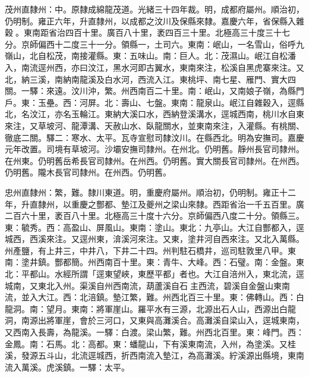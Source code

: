 \begin{pinyinscope}
茂州直隸州：中。原隸成綿龍茂道。光緒三十四年裁。明，成都府屬州。順治初，仍明制。雍正六年，升直隸州，以成都之汶川及保縣來隸。嘉慶六年，省保縣入雜穀。東南距省治四百十里。廣百八十里，袤四百三十里。北極高三十度三十七分。京師偏西十二度三十一分。領縣一，土司六。東南：岷山，一名雪山，俗呼九嶺山，北自松茂，南接灌縣。東：五味山。南：巨人。北：茂濕山。岷江自松潘入，南流逕州西，亦曰汶江，黑水河即古翼水，東南來注，松溪自黑虎寨來注。又北，納三溪，南納南龍溪及白水河，西流入江。東桃坪、南七星、雁門、實大四關。一驛：來遠。汶川沖，繁。州西南百二十里。南：岷山，又南娘子嶺，為縣門戶。東：玉壘。西：河屏。北：壽山、七盤。東南：龍泉山。岷江自雜穀入，逕縣北，名汶江，亦名玉輪江。東納大溪口水，西納登溪溝水，逕城西南，桃川水自東來注，又草坡河、龍潭溝、天赦山水、臥龍關水，並東南來注，入灌縣。有桃關、徹底二關。驛二：寒水、太平。瓦寺宣慰司隸汶川。在縣西北。明為安撫司。嘉慶元年改置。司境有草坡河。沙壩安撫司隸州。在州北。仍明舊。靜州長官司隸州。在州東。仍明舊岳希長官司隸州。在州西。仍明舊。實大關長官司隸州。在州西。仍明舊。隴木長官司隸州。在州西。仍明舊。

忠州直隸州：繁，難。隸川東道。明，重慶府屬州。順治初，仍明制。雍正十二年，升直隸州，以重慶之酆都、墊江及夔州之梁山來隸。西距省治一千五百里。廣二百六十里，袤百八十里。北極高三十度十六分。京師偏西八度二十分。領縣三。東：毓秀。西：高盈山、屏風山。東南：塗山。東北：九亭山。大江自酆都入，逕城西，西溪來注。又逕州東，渰溪河來注。又東，塗井河自西來注。又北入萬縣。州產鹽，有上井三，中井八，下井二十四。州判駐石橋井，巡司駐敦里八甲。東南：塗井鎮。酆都簡。州西南百十里。東：青牛、大峰。西：石璧。南：金盤。東北：平都山。水經所謂「逕東望峽，東歷平都」者也。大江自涪州入，東北流，逕城南，又東北入州。渠溪自州西南流，葫蘆溪自石主西流，碧溪自金盤山東南流，並入大江。西：北涪鎮。墊江繁，難。州西北百三十里。東：佛轉山。西：白龍洞。南：望月。東南：將軍崖山。羅平水有三源，北源出石人山，西源出白龍洞，南源出將軍崖，會於三河口，又東與高灘溪合。高灘溪自梁山入，逕城東南，又西南入長壽，為龍溪。一驛：白渡。梁山繁，難。州西北百里。東：峰門。西：金鳳。南：石馬。北：高都。東：蟠龍山，下有溪東南流，入州，為塗溪。又桂溪，發源五斗山，北流逕城西，折西南流入墊江，為高灘溪。紵溪源出縣境，東南流入萬溪。虎溪鎮。一驛：太平。


\end{pinyinscope}
